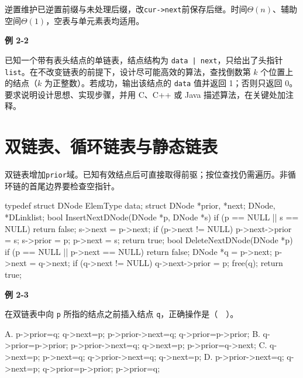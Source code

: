 逆置维护已逆置前缀与未处理后缀，改\texttt{cur->\allowbreak{}next}前保存后继。时间\(\Theta(n)\)、辅助空间\(\Theta(1)\)，空表与单元素表均适用。

\par\medskip{}\noindent\hypertarget{DS02-E02}{}\label{DS02-E02}\textbf{例 2-2}\par\nobreak\smallskip

已知一个带有表头结点的单链表，结点结构为 \texttt{data | next}，只给出了头指针 \texttt{list}。在不改变链表的前提下，设计尽可能高效的算法，查找倒数第 \(k\) 个位置上的结点（\(k\) 为正整数）。若成功，输出该结点的 \texttt{data} 值并返回 1；否则只返回 0。要求说明设计思想、实现步骤，并用 C、C++ 或 Java 描述算法，在关键处加注释。

\section{双链表、循环链表与静态链表}\label{DS02-variants}

双链表增加\texttt{prior}域。已知有效结点后可直接取得前驱；按位查找仍需遍历。非循环链的首尾边界要检查空指针。

\par\smallskip\noindent\begin{minipage}{\linewidth}
\begin{codeblock}[language={C++}]
typedef struct DNode {
    ElemType data;
    struct DNode *prior, *next;
} DNode, *DLinklist;
bool InsertNextDNode(DNode *p, DNode *s) {
    if (p == NULL || s == NULL) return false;
    s->next = p->next;
    if (p->next != NULL) p->next->prior = s;
    s->prior = p;
    p->next = s;
    return true;
}
bool DeleteNextDNode(DNode *p) {
    if (p == NULL || p->next == NULL) return false;
    DNode *q = p->next;
    p->next = q->next;
    if (q->next != NULL) q->next->prior = p;
    free(q);
    return true;
}
\end{codeblock}
\end{minipage}\par\smallskip

\par\medskip{}\noindent\hypertarget{DS02-E03}{}\label{DS02-E03}\textbf{例 2-3}\par\nobreak\smallskip

在双链表中向 \texttt{p} 所指的结点之前插入结点 \texttt{q}，正确操作是（　）。

\par\smallskip\noindent\begin{minipage}{\linewidth}
\begin{codeblock}[language={}]
A. p->prior=q; q->next=p;
   p->prior->next=q; q->prior=p->prior;
B. q->prior=p->prior; p->prior->next=q;
   q->next=p; p->prior=q->next;
C. q->next=p; p->next=q;
   q->prior->next=q; q->next=p;
D. p->prior->next=q; q->next=p;
   q->prior=p->prior; p->prior=q;
\end{codeblock}
\end{minipage}\par\smallskip


